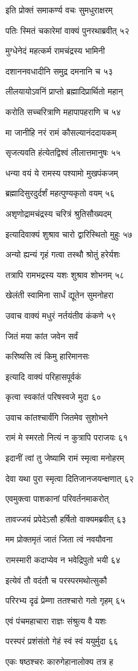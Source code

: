 इति प्रोक्तं समाकर्ण्य वचः सुमधुराक्षरम्

पतिः स्मितं चकारेमां वाक्यं पुनरथाब्रवीत् ५२

मुग्धेनेदं महत्कर्म रामचंद्रस्य भामिनी

दशाननवधादीनि समुद्र दमनानि च ५३

लीलयायोऽवनिं प्राप्तो ब्रह्मादिप्रार्थितो महान्

करोति सच्चरित्राणि महापापहराणि च ५४

मा जानीहि नरं रामं कौसल्यानंददायकम्

सृजत्यवति हंत्येतद्विश्वं लीलात्तमानुषः ५५

धन्या वयं ये रामस्य पश्यामो मुखपंकजम्

ब्रह्मादिसुरदुर्दर्शं महत्पुण्यकृतो वयम् ५६

अशृणोद्रामचंद्रस्य चरित्रं श्रुतिसौख्यदम्

इत्यादिवाक्यं शुश्राव चारो द्वारिस्थितो मुहुः ५७

अन्यो ह्यन्यं गृहं गत्वा तस्थौ श्रोतुं हरेर्यशः

तत्रापि रामभद्रस्य यशः शुश्राव शोभनम् ५८

खेलंती स्वामिना सार्धं द्यूतेन सुमनोहरा

उवाच वाक्यं मधुरं नर्तयंतीव कंकणे ५९

जितं मया कांत जवेन सर्वं

करिष्यसि त्वं किमु हारिमानसः

इत्यादि वाक्यं परिहासपूर्वकं

कृत्वा स्वकांतं परिषस्वजे मुदा ६०

उवाच कांतश्चार्वंगि जितमेव सुशोभने

रामं मे स्मरतो नित्यं न कुत्रापि पराजयः ६१

इदानीं त्वां तु जेष्यामि रामं स्मृत्वा मनोहरम्

देवा यथा पुरा स्मृत्वा दितिजानजयन्क्षणात् ६२

एवमुक्त्वा पाशकानां परिवर्तनमाकरोत्

तावज्जयं प्रपेदेऽसौ हर्षितो वाक्यमब्रवीत् ६३

मम प्रोक्तमृतं जातं जिता त्वं नवयौवना

रामस्मारी कदाप्येव न भवेद्रिपुतो भयी ६४

इत्येवं तौ वदंतौ च परस्परमथोत्सुकौ

परिरभ्य दृढं प्रेम्णा ततश्चारो गतो गृहम् ६५

एवं पंचमहाचारा राज्ञः संश्रुत्य वै यशः

परस्परं प्रशंसंतो गेहं स्वं स्वं ययुर्मुदा ६६

एकः षष्ठश्चरः कारुगेहानालोक्य तत्र ह

